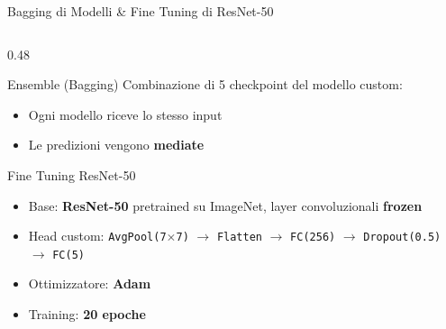\documentclass[9pt,serif,usenames,dvipsnames]{beamer}
\begin{document}
\begin{frame}{\centering Bagging di Modelli \& Fine Tuning di ResNet-50}
    \begin{columns}[T]

        \begin{column}{0.48\textwidth}
            \begin{block}{Ensemble (Bagging)}
                Combinazione di 5 checkpoint del modello custom:
                \begin{itemize}
                    \item Ogni modello riceve lo stesso input
                    \item Le predizioni vengono \textbf{mediate}
                \end{itemize}
            \end{block}

            \vspace{0.05cm}

            \begin{block}{Fine Tuning ResNet-50}
                \begin{itemize}
                    \item Base: \textbf{ResNet-50} pretrained su ImageNet,
                    layer convoluzionali \textbf{frozen}
                    \item Head custom: \texttt{AvgPool(7$\times$7)}
                    $\to$ \texttt{Flatten} $\to$ \texttt{FC(256)}
                    $\to$ \texttt{Dropout(0.5)} $\to$ \texttt{FC(5)}
					\item Ottimizzatore: \textbf{Adam}
                    \item Training: \textbf{20 epoche}
                \end{itemize}
            \end{block}
        \end{column}


\end{columns}
\end{frame}
\end{document}
